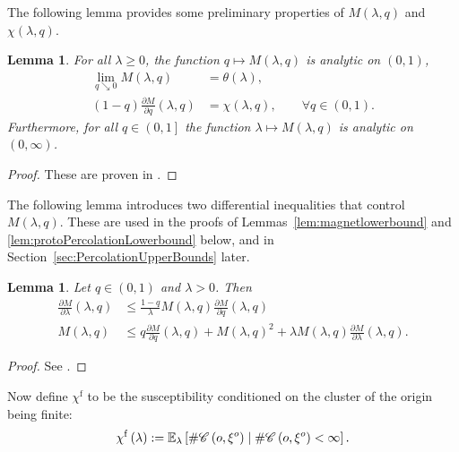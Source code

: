 \documentclass[10pt,a4paper,dvipsnames]{article}
\newtheorem{lemma}[theorem]{Lemma}
\theoremstyle{definition}
\theoremstyle{remark}
\newcommand{\ela}{\mathbb E_{\lambda}}
\newcommand{\C}{\mathscr {C}}
\newcommand{\orig}{o}
\numberwithin{equation}{section}
\begin{document}
The following lemma provides some preliminary properties of $M\left(\lambda,q\right)$ and $\chi\left(\lambda,q\right)$.
\begin{lemma}
\label{lem:MagnetPrelim}
    For all $\lambda\geq 0$, the function $q\mapsto M\left(\lambda,q\right)$ is analytic on $\left(0,1\right)$,
    \begin{align}
        \lim_{q\searrow0}M\left(\lambda,q\right) &= \theta\left(\lambda\right),\\
        \left(1-q\right)\frac{\partial M}{\partial q}\left(\lambda,q\right) &= \chi\left(\lambda,q\right), \qquad\forall q\in\left(0,1\right).\label{eqn:magnetisationDerivative}
    \end{align}
    Furthermore, for all $q\in\left(0,1\right]$ the function $\lambda\mapsto M\left(\lambda,q\right)$ is analytic on $\left(0,\infty\right)$.
\end{lemma}


\begin{proof}
    These are proven in \cite[Lemmas~3.1, 3.4, 3.7]{caicedo2023critical}.
\end{proof}



The following lemma introduces two differential inequalities that control $M\left(\lambda,q\right)$. These are used in the proofs of Lemmas~\ref{lem:magnetlowerbound} and \ref{lem:protoPercolationLowerbound} below, and in Section~\ref{sec:PercolationUpperBounds} later.
\begin{lemma}
    Let $q\in\left(0,1\right)$ and $\lambda>0$. Then
    \begin{align}
        \frac{\partial M}{\partial \lambda}\left(\lambda,q\right) &\leq \frac{1-q}{\lambda}M\left(\lambda,q\right)\frac{\partial M}{\partial q}\left(\lambda,q\right) \label{eqn:magnetisationDiffEqnPtOne}\\
        M\left(\lambda,q\right) &\leq q\frac{\partial M}{\partial q}\left(\lambda,q\right) + M\left(\lambda,q\right)^2 + \lambda M\left(\lambda,q\right)\frac{\partial M}{\partial \lambda}\left(\lambda,q\right).
    \end{align}
\end{lemma}

\begin{proof}
    See \cite[Lemma~3.6]{caicedo2023critical}.
\end{proof}

Now define $\chi^\mathrm{f}$ to be the susceptibility conditioned on the cluster of the origin being finite:
\begin{equation}
    \chi^{\rm f}\left(\lambda\right) := \ela\left[\#\C\left(\orig,\xi^\orig\right)\mid \#\C\left(\orig,\xi^\orig\right)<\infty\right].
\end{equation}
\end{document}
